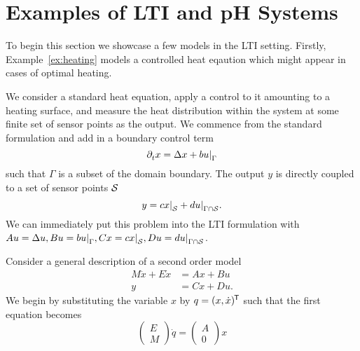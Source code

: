 \section{Examples of LTI and pH Systems}

To begin this section we showcase a few models in the LTI setting.
Firstly, Example~\ref{ex:heating} models a controlled heat eqaution which might appear in cases of optimal heating.

\begin{example}\label{ex:heating}
    We consider a standard heat equation, apply a control to it amounting to a heating surface, and measure the heat distribution within the system at some finite set of sensor points as the output.
    We commence from the standard formulation and add in a boundary control term
    \begin{equation*}
        \pd[t]{} x = \lapl{x} + b \res{u}{\Gamma}
    \end{equation*}
    such that $\Gamma$ is a subset of the domain boundary.
    The output $y$ is directly coupled to a set of sensor points $\mathcal{S}$
    \begin{equation*}
        y = c \res{x}{\mcl{S}} + d \res{u}{\Gamma \cap \mcl{S}}.
    \end{equation*}
    We can immediately put this problem into the LTI formulation with $A u = \lapl{u}, B u = b \res{u}{\Gamma}, C x = c \res{x}{\mcl{S}}, D u = d \res{u}{\Gamma \cap \mcl{S}}$.
\end{example}

\begin{example}
    Consider a general description of a second order model
    \begin{align*}
        M \ddot{x} + E \dot{x} &= A x + B u \\
        y &= C x + D u.
    \end{align*}
    We begin by substituting the variable $x$ by $q = (x, \dot{x})^{\mkern-1.5mu \mathsf{T}}$ such that the first equation becomes
    \begin{equation*}
        \begin{pmatrix}
            E \\
            M
        \end{pmatrix} \dot{q} =
        \begin{pmatrix}
            A \\
            0
        \end{pmatrix} x
    \end{equation*}

\end{example}

